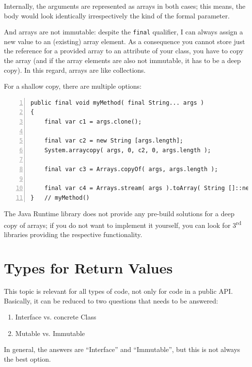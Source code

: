 \documentclass[11pt,a4paper, titlepage, parskip=half, headsepline, footsepline, cleardoublepage=current, headheight=1cm]{scrbook}
\begin{document}
Internally, the arguments are represented as arrays in both cases; this means, the body would look identically irrespectively the kind of the formal parameter.

And arrays are not immutable: despite the \lstinline|final| qualifier, I can always assign a new value to an (existing) array element. As a consequence you cannot store just the reference for a provided array to an attribute of your class, you have to copy the array (and if the array elements are also not immutable, it has to be a deep copy). In this regard, arrays are like collections.

For a shallow copy, there are multiple options:
\begin{lstlisting}[numbers=left]
public final void myMethod( final String... args )
{
    final var c1 = args.clone();

    final var c2 = new String [args.length];
    System.arraycopy( args, 0, c2, 0, args.length );

    final var c3 = Arrays.copyOf( args, args.length );

    final var c4 = Arrays.stream( args ).toArray( String []::new );
}   // myMethod()
\end{lstlisting}

The Java Runtime library does not provide any pre-build solutions for a deep copy of arrays; if you do not want to implement it yourself, you can look for 3\textsuperscript{rd} libraries  providing the respective functionality.


\section{Types for Return Values}\label{sec:TypesReturnValues}
This topic is relevant for all types of code, not only for code in a public API. Basically, it can be reduced to two questions that needs to be answered:
\begin{enumerate}
\item{Interface vs. concrete Class}
\item{Mutable vs. Immutable}
\end{enumerate}

In general, the answers are “Interface” and “Immutable”, but this is not always the best option.
\end{document}
